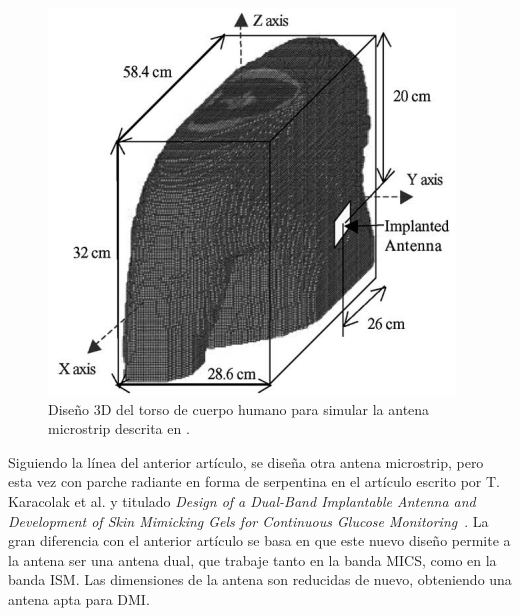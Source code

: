 \vspace{1.5cm}

\begin{figure}[!htb]
    \centering
    \includegraphics[scale=0.3]{./ContextoTecnologico/articulos/kim2}
    \caption{Diseño 3D del torso de cuerpo humano para simular la antena microstrip descrita en \cite{kim}.}
    \label{fig:fig2.14}
\end{figure}

Siguiendo la línea del anterior artículo, se diseña otra antena microstrip, pero esta vez con parche radiante en forma de serpentina en el artículo escrito por T. Karacolak et al. y titulado \textit{Design of a Dual-Band Implantable Antenna and Development of Skin Mimicking Gels for Continuous Glucose Monitoring}~\cite{karacola}. La gran diferencia con el anterior artículo se basa en que este nuevo diseño permite a la antena ser una antena dual, que trabaje tanto en la banda MICS, como en la banda ISM. Las dimensiones de la antena son reducidas de nuevo, obteniendo una antena apta para DMI.

